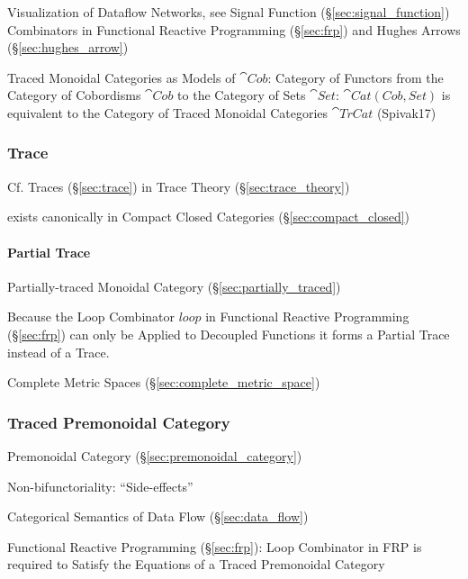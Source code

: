 Visualization of Dataflow Networks, see Signal Function
(\S\ref{sec:signal_function}) Combinators in Functional Reactive
Programming (\S\ref{sec:frp}) and Hughes Arrows
(\S\ref{sec:hughes_arrow})

Traced Monoidal Categories as Models of $\cat{Cob}$: Category of
Functors from the Category of Cobordisms $\cat{Cob}$ to the Category
of Sets $\cat{Set}$: $\cat{Cat(Cob,Set)}$ is equivalent to the
Category of Traced Monoidal Categories $\cat{TrCat}$ (Spivak17)



\subsubsection{Trace}\label{sec:category_trace}

\fist Cf. Traces (\S\ref{sec:trace}) in Trace Theory
(\S\ref{sec:trace_theory})

exists canonically in Compact Closed Categories
(\S\ref{sec:compact_closed}) %



\paragraph{Partial Trace}\label{sec:partial_trace}\hfill

Partially-traced Monoidal Category (\S\ref{sec:partially_traced})

Because the Loop Combinator $loop$ in Functional Reactive Programming
(\S\ref{sec:frp}) can only be Applied to Decoupled Functions it forms
a Partial Trace instead of a Trace.

Complete Metric Spaces (\S\ref{sec:complete_metric_space})



\subsubsection{Traced Premonoidal Category}
\label{sec:traced_premonoidal}

Premonoidal Category (\S\ref{sec:premonoidal_category})

Non-bifunctoriality: ``Side-effects'' \cite{jacobs-heunen-hasuo09}

Categorical Semantics of Data Flow (\S\ref{sec:data_flow})

Functional Reactive Programming (\S\ref{sec:frp}): Loop Combinator in
FRP is required to Satisfy the Equations of a Traced Premonoidal
Category




